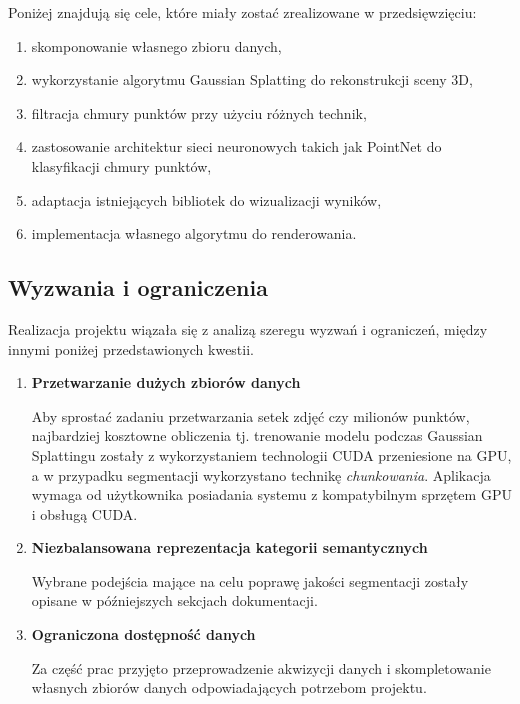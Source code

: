 Poniżej znajdują się cele, które miały zostać zrealizowane w przedsięwzięciu:

\begin{enumerate}
    \item skomponowanie własnego zbioru danych, 
    \item wykorzystanie algorytmu Gaussian Splatting do rekonstrukcji sceny 3D,
    \item filtracja chmury punktów przy użyciu różnych technik, 
    \item zastosowanie architektur sieci neuronowych takich jak PointNet do klasyfikacji chmury punktów, 
    \item adaptacja istniejących bibliotek do wizualizacji wyników, 
    \item implementacja własnego algorytmu do renderowania.
\end{enumerate}

\subsection{Wyzwania i ograniczenia}

Realizacja projektu wiązała się z analizą szeregu wyzwań i ograniczeń, między innymi poniżej przedstawionych kwestii.

\begin{enumerate}
    \item \textbf{Przetwarzanie dużych zbiorów danych}   
    
    Aby sprostać zadaniu przetwarzania setek zdjęć czy milionów punktów, najbardziej kosztowne obliczenia tj. trenowanie modelu podczas Gaussian Splattingu zostały z wykorzystaniem technologii CUDA przeniesione na GPU, a w przypadku segmentacji wykorzystano technikę \textit{chunkowania}. Aplikacja wymaga od użytkownika posiadania systemu z kompatybilnym sprzętem GPU i obsługą CUDA.
    \item \textbf{Niezbalansowana reprezentacja kategorii semantycznych}    
    
    Wybrane podejścia mające na celu poprawę jakości segmentacji zostały opisane w późniejszych sekcjach dokumentacji.
    \item \textbf{Ograniczona dostępność danych}    
    
    Za część prac przyjęto przeprowadzenie akwizycji danych i skompletowanie własnych zbiorów danych odpowiadających potrzebom projektu. 
\end{enumerate}